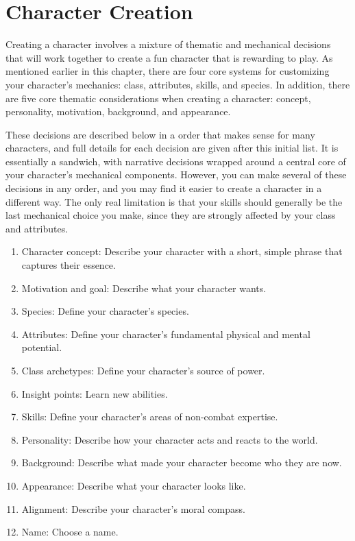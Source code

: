 \section{Character Creation}\label{Character Creation}

  Creating a character involves a mixture of thematic and mechanical decisions that will work together to create a fun character that is rewarding to play.
  As mentioned earlier in this chapter, there are four core systems for customizing your character's mechanics: class, attributes, skills, and species.
  In addition, there are five core thematic considerations when creating a character: concept, personality, motivation, background, and appearance.

  These decisions are described below in a order that makes sense for many characters, and full details for each decision are given after this initial list.
  It is essentially a sandwich, with narrative decisions wrapped around a central core of your character's mechanical components.
  However, you can make several of these decisions in any order, and you may find it easier to create a character in a different way.
  The only real limitation is that your skills should generally be the last mechanical choice you make, since they are strongly affected by your class and attributes.

  \begin{enumerate}
    \item Character concept: Describe your character with a short, simple phrase that captures their essence.
    \item Motivation and goal: Describe what your character wants.

    \item Species: Define your character's species.
    \item Attributes: Define your character's fundamental physical and mental potential.
    \item Class archetypes: Define your character's source of power.
    \item Insight points: Learn new abilities.
    \item Skills: Define your character's areas of non-combat expertise.

    \item Personality: Describe how your character acts and reacts to the world.
    \item Background: Describe what made your character become who they are now.
    \item Appearance: Describe what your character looks like.
    \item Alignment: Describe your character's moral compass.
    \item Name: Choose a name.
  \end{enumerate}

